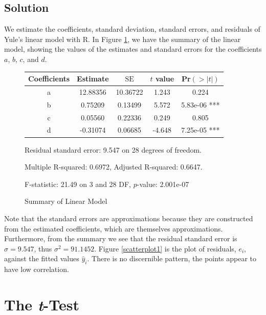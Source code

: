 \documentclass{amsart}
\DeclareMathOperator{\SE}{\text{SE}}
\begin{document}
		\subsection{Solution} %
		\label{sub:solution1}
			We estimate the coefficients, standard deviation, standard errors, and residuals of Yule's linear model with R.
			In Figure \ref{lmsummary}, we have the summary of the linear model, showing the values of the estimates and standard errors for the coefficients $a$, $b$, $c$, and $d$.
			\begin{figure}[b]
				\begin{tabular}{ccccc}
					\hline 
					Coefficients & Estimate & $\SE$ & $t$ value & Pr$(>|t|)$ \\
					\hline
					\hline
					a & 12.88356 & 10.36722 & 1.243 & 0.224 \\
					b & 0.75209 & 0.13499 & 5.572 & 5.83e-06 *** \\
					c & 0.05560 & 0.22336 & 0.249 & 0.805 \\
					d & -0.31074 & 0.06685 & -4.648 & 7.25e-05 *** \\
					\hline
				\end{tabular}

				Residual standard error: 9.547 on 28 degrees of freedom.

				Multiple R-squared: 0.6972, Adjusted R-squared: 0.6647.

				F-statistic: 21.49 on 3 and 28 DF, $p$-value: 2.001e-07
				\caption{Summary of Linear Model}
				\label{lmsummary}
			\end{figure}
			Note that the standard errors are approximations because they are constructed from the estimated coefficients, which are themselves approximations. 
			Furthermore, from the summary we see that the residual standard error is $\sigma = 9.547$, thus $\sigma^{2} = 91.1452$.
			Figure \ref{scatterplot1} is the plot of residuals, $e_{i}$, against the fitted values $\hat{y}_{i}$. 
			There is no discernible pattern, the points appear to have low correlation.


	\section{The \textit{t}-Test} %
	\label{sec:the_t-Test}
\end{document}
